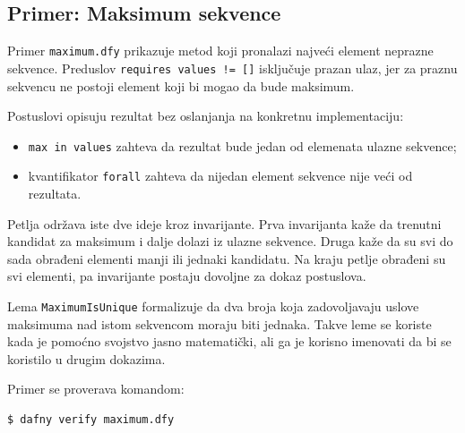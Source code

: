 \subsection{Primer: Maksimum sekvence}\label{primer-maksimum-sekvence}

Primer \texttt{maximum.dfy} prikazuje metod koji pronalazi najveći element neprazne sekvence. Preduslov \texttt{requires\ values\ !=\ []} isključuje prazan ulaz, jer za praznu sekvencu ne postoji element koji bi mogao da bude maksimum.


Postuslovi opisuju rezultat bez oslanjanja na konkretnu implementaciju:

\begin{itemize}
\tightlist
\item
  \texttt{max\ in\ values} zahteva da rezultat bude jedan od elemenata ulazne sekvence;
\item
  kvantifikator \texttt{forall} zahteva da nijedan element sekvence nije veći od rezultata.
\end{itemize}

Petlja održava iste dve ideje kroz invarijante. Prva invarijanta kaže da trenutni kandidat za maksimum i dalje dolazi iz ulazne sekvence. Druga kaže da su svi do sada obrađeni elementi manji ili jednaki kandidatu. Na kraju petlje obrađeni su svi elementi, pa invarijante postaju dovoljne za dokaz postuslova.

Lema \texttt{MaximumIsUnique} formalizuje da dva broja koja zadovoljavaju uslove maksimuma nad istom sekvencom moraju biti jednaka. Takve leme se koriste kada je pomoćno svojstvo jasno matematički, ali ga je korisno imenovati da bi se koristilo u drugim dokazima.

Primer se proverava komandom:

\begin{verbatim}
$ dafny verify maximum.dfy
\end{verbatim}
